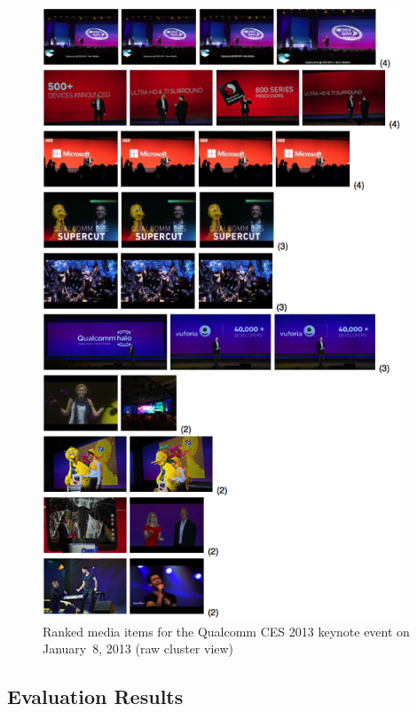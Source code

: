 \begin{figure}[!ht]
  \centering
  \includegraphics[width=0.95\textwidth,height=0.88\textheight,keepaspectratio]{qualcomm.png}
  \caption[Ranked media items for the Qualcomm CES 2013 keynote event]
  {Ranked media items for the Qualcomm CES 2013 keynote event
  on January~8, 2013 (raw cluster view)}
  \label{fig:qualcomm}
\end{figure}

\subsection{Evaluation Results}

